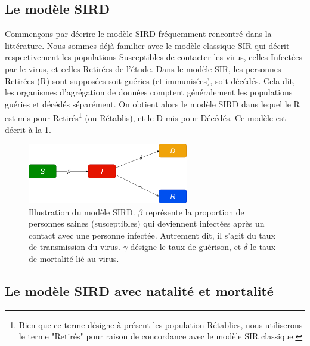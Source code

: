 \documentclass[
  french,
	10pt, %
]{fphw}
\begin{document}
\subsection{Le modèle SIRD}

Commençons par décrire le modèle SIRD fréquemment rencontré dans la littérature. Nous sommes déjà familier avec le modèle classique SIR qui décrit respectivement les populations Susceptibles de contacter les virus, celles Infectées par le virus, et celles Retirées de l'étude. Dans le modèle SIR, les personnes Retirées (R) sont supposées soit guéries (et immunisées), soit décédés. Cela dit, les organismes d'agrégation de données comptent généralement les populations guéries et décédés séparément. On obtient alors le modèle SIRD dans lequel le R est mis pour Retirés\footnote{Bien que ce terme désigne à présent les population Rétablies, nous utiliserons le terme "Retirés" pour raison de concordance avec le modèle SIR classique.} (ou Rétablis), et le D mis pour Décédés. Ce modèle est décrit à la \cref{fig:SIRD1}.
\begin{figure}[H]
  \centering
  \includegraphics[width=7cm]{SIRD1.png}
  \caption{Illustration du modèle SIRD. $\beta$ représente la proportion de personnes saines (susceptibles) qui deviennent infectées après un contact avec une personne infectée. Autrement dit, il s'agit du taux de transmission du virus. $\gamma$ désigne le taux de guérison, et $\delta$ le taux de mortalité lié au virus.}
  \label{fig:SIRD1}
\end{figure}


\subsection{Le modèle SIRD avec natalité et mortalité}
\end{document}
